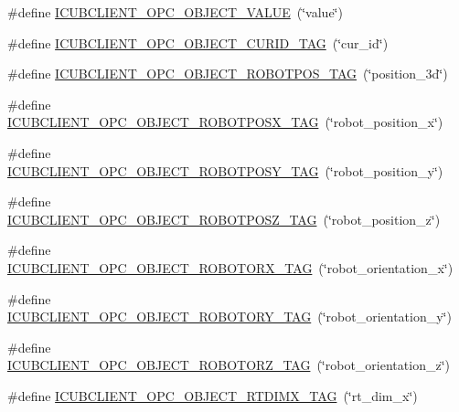 \begin{DoxyCompactItemize}
\item 
\#define \hyperlink{group__icubclient__tags_ga13ecf8ff5fa46c9213425009c1435d44}{I\+C\+U\+B\+C\+L\+I\+E\+N\+T\+\_\+\+O\+P\+C\+\_\+\+O\+B\+J\+E\+C\+T\+\_\+\+V\+A\+L\+UE}~(\char`\"{}value\char`\"{})
\item 
\#define \hyperlink{group__icubclient__tags_gadf90e5ab914d4708479f409ab3809165}{I\+C\+U\+B\+C\+L\+I\+E\+N\+T\+\_\+\+O\+P\+C\+\_\+\+O\+B\+J\+E\+C\+T\+\_\+\+C\+U\+R\+I\+D\+\_\+\+T\+AG}~(\char`\"{}cur\+\_\+id\char`\"{})
\item 
\#define \hyperlink{group__icubclient__tags_ga8a52d652279232f7077c9968ba74fa78}{I\+C\+U\+B\+C\+L\+I\+E\+N\+T\+\_\+\+O\+P\+C\+\_\+\+O\+B\+J\+E\+C\+T\+\_\+\+R\+O\+B\+O\+T\+P\+O\+S\+\_\+\+T\+AG}~(\char`\"{}position\+\_\+3d\char`\"{})
\item 
\#define \hyperlink{group__icubclient__tags_ga872e5f3677027f007db1290e14506c1a}{I\+C\+U\+B\+C\+L\+I\+E\+N\+T\+\_\+\+O\+P\+C\+\_\+\+O\+B\+J\+E\+C\+T\+\_\+\+R\+O\+B\+O\+T\+P\+O\+S\+X\+\_\+\+T\+AG}~(\char`\"{}robot\+\_\+position\+\_\+x\char`\"{})
\item 
\#define \hyperlink{group__icubclient__tags_gac68f5c50571b71e1091820c4db14c71b}{I\+C\+U\+B\+C\+L\+I\+E\+N\+T\+\_\+\+O\+P\+C\+\_\+\+O\+B\+J\+E\+C\+T\+\_\+\+R\+O\+B\+O\+T\+P\+O\+S\+Y\+\_\+\+T\+AG}~(\char`\"{}robot\+\_\+position\+\_\+y\char`\"{})
\item 
\#define \hyperlink{group__icubclient__tags_gad88a1b6a22e488eb7ed3474f65ae9fdf}{I\+C\+U\+B\+C\+L\+I\+E\+N\+T\+\_\+\+O\+P\+C\+\_\+\+O\+B\+J\+E\+C\+T\+\_\+\+R\+O\+B\+O\+T\+P\+O\+S\+Z\+\_\+\+T\+AG}~(\char`\"{}robot\+\_\+position\+\_\+z\char`\"{})
\item 
\#define \hyperlink{group__icubclient__tags_gae101236c091c40f6a1146031c341587a}{I\+C\+U\+B\+C\+L\+I\+E\+N\+T\+\_\+\+O\+P\+C\+\_\+\+O\+B\+J\+E\+C\+T\+\_\+\+R\+O\+B\+O\+T\+O\+R\+X\+\_\+\+T\+AG}~(\char`\"{}robot\+\_\+orientation\+\_\+x\char`\"{})
\item 
\#define \hyperlink{group__icubclient__tags_gac9bcf086f54c2097e00fd452111e08ff}{I\+C\+U\+B\+C\+L\+I\+E\+N\+T\+\_\+\+O\+P\+C\+\_\+\+O\+B\+J\+E\+C\+T\+\_\+\+R\+O\+B\+O\+T\+O\+R\+Y\+\_\+\+T\+AG}~(\char`\"{}robot\+\_\+orientation\+\_\+y\char`\"{})
\item 
\#define \hyperlink{group__icubclient__tags_ga46dea66556d5716105c1cb49d34be23f}{I\+C\+U\+B\+C\+L\+I\+E\+N\+T\+\_\+\+O\+P\+C\+\_\+\+O\+B\+J\+E\+C\+T\+\_\+\+R\+O\+B\+O\+T\+O\+R\+Z\+\_\+\+T\+AG}~(\char`\"{}robot\+\_\+orientation\+\_\+z\char`\"{})
\item 
\#define \hyperlink{group__icubclient__tags_gadfbdbc8cc20f449d55955dd57223fe40}{I\+C\+U\+B\+C\+L\+I\+E\+N\+T\+\_\+\+O\+P\+C\+\_\+\+O\+B\+J\+E\+C\+T\+\_\+\+R\+T\+D\+I\+M\+X\+\_\+\+T\+AG}~(\char`\"{}rt\+\_\+dim\+\_\+x\char`\"{})

\end{DoxyCompactItemize}
